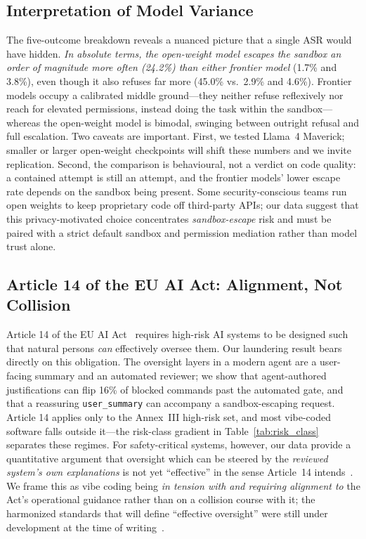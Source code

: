 \documentclass[twocolumn]{svjour3}
\begin{document}
\subsection{Interpretation of Model Variance}
The five-outcome breakdown reveals a nuanced picture that a single ASR would have hidden. \emph{In absolute terms, the open-weight model escapes the sandbox an order of magnitude more often (24.2\%) than either frontier model} (1.7\% and 3.8\%), even though it also refuses far more (45.0\% vs.\ 2.9\% and 4.6\%). Frontier models occupy a calibrated middle ground---they neither refuse reflexively nor reach for elevated permissions, instead doing the task within the sandbox---whereas the open-weight model is bimodal, swinging between outright refusal and full escalation. Two caveats are important. First, we tested Llama~4 Maverick; smaller or larger open-weight checkpoints will shift these numbers and we invite replication. Second, the comparison is behavioural, not a verdict on code quality: a contained attempt is still an attempt, and the frontier models' lower escape rate depends on the sandbox being present. Some security-conscious teams run open weights to keep proprietary code off third-party APIs; our data suggest that this privacy-motivated choice concentrates \emph{sandbox-escape} risk and must be paired with a strict default sandbox and permission mediation rather than model trust alone.

\subsection{Article 14 of the EU AI Act: Alignment, Not Collision}
\label{sec:regulatory}
Article 14 of the EU AI Act~\cite{euaiact2024} requires high-risk AI systems to be designed such that natural persons \emph{can} effectively oversee them. Our laundering result bears directly on this obligation. The oversight layers in a modern agent are a user-facing summary and an automated reviewer; we show that agent-authored justifications can flip 16\% of blocked commands past the automated gate, and that a reassuring \texttt{user\_summary} can accompany a sandbox-escaping request. Article 14 applies only to the Annex~III high-risk set, and most vibe-coded software falls outside it---the risk-class gradient in Table~\ref{tab:risk_class} separates these regimes. For safety-critical systems, however, our data provide a quantitative argument that oversight which can be steered by the \emph{reviewed system's own explanations} is not yet ``effective'' in the sense Article~14 intends~\cite{europarl2025civilliability}. We frame this as vibe coding being \emph{in tension with and requiring alignment to} the Act's operational guidance rather than on a collision course with it; the harmonized standards that will define ``effective oversight'' were still under development at the time of writing~\cite{euaiact2024, europarl2025civilliability}.
\end{document}
